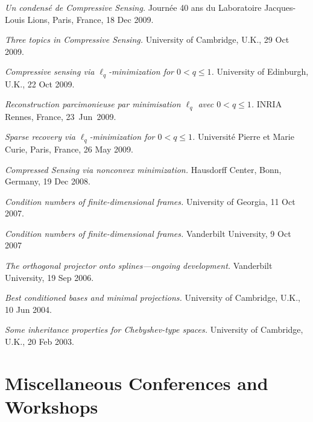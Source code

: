 \documentclass[11pt]{article}
\begin{document}
\item {\sl Un condens\'e de Compressive Sensing.} Journ\'ee 40 ans du Laboratoire Jacques-Louis Lions, Paris, France, 18 Dec 2009.
\item {\sl Three topics in Compressive Sensing.} University of Cambridge, U.K., 29 Oct 2009.
\item {\sl Compressive sensing via $\ell_q$-minimization for $0 < q \le 1$.} University of Edinburgh, U.K., 22 Oct 2009.
\item {\sl Reconstruction parcimonieuse par minimisation $\ell_q$ avec $0<q \le 1$.} INRIA Rennes, France, 23~Jun~2009.
\item {\sl Sparse recovery via $\ell_q$-minimization for $0<q \le 1$.} Universit\'e Pierre et Marie Curie, Paris, France, 26 May 2009.
\item {\sl Compressed Sensing via nonconvex minimization.} Hausdorff Center, Bonn, Germany, 19 Dec 2008.
\item {\sl Condition numbers of finite-dimensional frames.}
University of Georgia, 11 Oct 2007.
\item {\sl Condition numbers of finite-dimensional frames.} Vanderbilt University,
9 Oct 2007
\item {\sl The orthogonal projector onto splines---ongoing development.}
Vanderbilt University, 19 Sep 2006.
\item  {\sl Best conditioned bases and minimal projections.}
University of Cambridge, U.K., 10 Jun 2004.
\item {\sl Some inheritance properties for Chebyshev-type spaces.}
University of Cambridge, U.K., 20 Feb 2003.
\eitemize



\section{Miscellaneous Conferences and Workshops}
\end{document}
